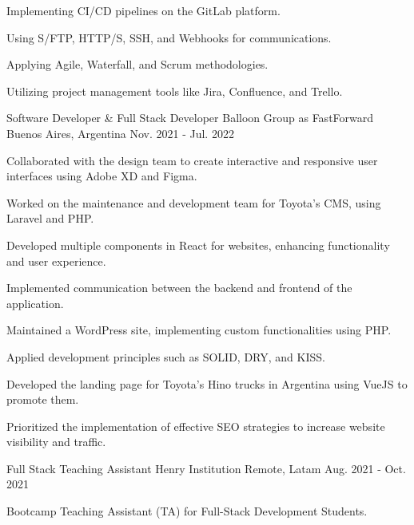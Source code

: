 \begin{cventries}
{\begin{cvitems}
        \item {Implementing CI/CD pipelines on the GitLab platform.}
        \item {Using S/FTP, HTTP/S, SSH, and Webhooks for communications.}
        \item {Applying Agile, Waterfall, and Scrum methodologies.}
        \item {Utilizing project management tools like Jira, Confluence, and Trello.}
      \end{cvitems}
    }
  \vspace{5.5mm}
  \cventry
    {Software Developer \& Full Stack Developer} %
    {Balloon Group as FastForward} %
    {Buenos Aires, Argentina} %
    {Nov. 2021 - Jul. 2022} %
    {
      \begin{cvitems} %
        \item {Collaborated with the design team to create interactive and responsive user interfaces using Adobe XD and Figma.}
        \item {Worked on the maintenance and development team for Toyota's CMS, using Laravel and PHP.}
        \item {Developed multiple components in React for websites, enhancing functionality and user experience.}
        \item {Implemented communication between the backend and frontend of the application.}
        \item {Maintained a WordPress site, implementing custom functionalities using PHP.}
        \item {Applied development principles such as SOLID, DRY, and KISS.}
        \item {Developed the landing page for Toyota's Hino trucks in Argentina using VueJS to promote them.}
        \item {Prioritized the implementation of effective SEO strategies to increase website visibility and traffic.}
      \end{cvitems}
    }
  \vspace{5.5mm}
  \cventry
    {Full Stack Teaching Assistant} %
    {Henry Institution} %
    {Remote, Latam} %
    {Aug. 2021 - Oct. 2021} %
    {
      \begin{cvitems} %
        \item {Bootcamp Teaching Assistant (TA) for Full-Stack Development Students.}

\end{cvitems}}
\end{cventries}
